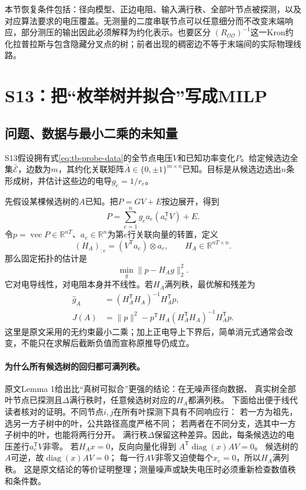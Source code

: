 \documentclass[UTF8,11pt,fontset=fandol,openany,oneside]{ctexbook}
\theoremstyle{definition}
\theoremstyle{remark}
\numberwithin{equation}{chapter}
\begin{document}
本节恢复条件包括：径向模型、正边电阻、输入满行秩、全部叶节点被探测，以及对应算法要求的电压覆盖。无测量的二度串联节点可以任意细分而不改变末端响应，部分测压的输出因此必须解释为约化表示。也要区分
$(R_{\mathcal O\mathcal O})^{-1}$这一Kron约化拉普拉斯与包含隐藏分叉点的树；前者出现的稠密边不等于末端间的实际物理线路。

\section{S13：把“枚举树并拟合”写成MILP}
\label{sec:tb-S13}

\subsection{问题、数据与最小二乘的未知量}

S13\citep{S13}假设拥有式\eqref{eq:tb-probe-data}的全节点电压$V$和已知功率变化$P$。给定候选边全集$\bar{\mathcal E}$，边数为$m$，其约化关联矩阵$\bar A\in\{0,\pm1\}^{m\times n}$已知。目标是从候选边选出$n$条形成树，并估计这些边的电导$g_e=1/r_e$。

先假设某棵候选树的$A$已知。把$P=GV+E$按边展开，得到
\[
 P=\sum_{e=1}^n g_ea_e(a_e^{\mathsf T}V)+E.
\]
令$p=\operatorname{vec}P\in\mathbb R^{nT}$、$a_e\in\mathbb R^n$为第$e$行关联向量的转置，定义
\begin{equation}
 (H_A)_{:e}=(V^{\mathsf T}a_e)\otimes a_e,\qquad
 H_A\in\mathbb R^{nT\times n}.
 \label{eq:tb-S13-H}
\end{equation}
那么固定拓扑的估计是
\begin{equation}
 \min_g\|p-H_Ag\|_2^2.
 \label{eq:tb-S13-fixed}
\end{equation}
它对电导线性，对电阻本身并不线性。若$H_A$满列秩，最优解和残差为
\begin{align}
 \widehat g_A&=(H_A^{\mathsf T}H_A)^{-1}H_A^{\mathsf T}p,\\
 J(A)&=\|p\|^2-p^{\mathsf T}H_A(H_A^{\mathsf T}H_A)^{-1}H_A^{\mathsf T}p.
 \label{eq:tb-S13-score}
\end{align}
这里是原文采用的无约束最小二乘；加上正电导上下界后，简单消元式通常会改变，不能只在求解后截断负值而宣称原推导仍成立。


\paragraph{为什么所有候选树的回归都可满列秩。}
原文Lemma 1给出比“真树可拟合”更强的结论：在无噪声径向数据、
真实树全部叶节点已探测且$\Delta$满行秩时，任意候选树对应的$H_A$都满列秩。
下面给出便于线代读者核对的证明。不同节点$i,j$在所有叶探测下具有不同响应行：
若一方为祖先，选另一方子树中的叶，公共路径高度严格不同；
若两者在不同分支，选其中一方子树中的叶，也能将两行分开。
满行秩$\Delta$保留这种差异。因此，每条候选边的电压差行$a_e^{\mathsf T}V$非零。
若$H_Ax=0$，反向向量化得到
$A^{\mathsf T}\operatorname{diag}(x)AV=0$。
候选树的$A$可逆，故$\operatorname{diag}(x)AV=0$；
每一行$AV$非零又迫使每个$x_e=0$，所以$H_A$满列秩。
这是原文结论的等价证明整理；测量噪声或缺失电压时必须重新检查数值秩和条件数。
\end{document}
